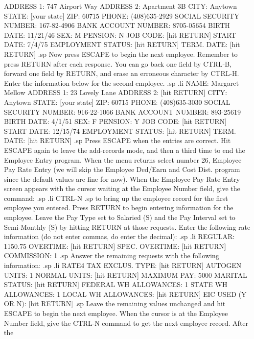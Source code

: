    ADDRESS 1: 747 Airport Way
   ADDRESS 2: Apartment 3B
   CITY:      Anytown
   STATE:     [your state]
   ZIP:       60715
   PHONE:     (408)635-2929
   SOCIAL SECURITY NUMBER:     167-82-4906
   BANK ACCOUNT NUMBER:        8705-05654
   BIRTH DATE:		       11/21/46
   SEX:        M
   PENSION:    N
   JOB CODE:   [hit RETURN]
   START DATE: 7/4/75
   EMPLOYMENT STATUS: [hit RETURN]
   TERM. DATE: [hit RETURN]
.sp
Now press ESCAPE to begin the next employee.
Remember to press RETURN after each response.  You can go back one
field by CTRL-B, forward one field by RETURN, and erase an erroneous
character by CTRL-H.  Enter the information below for the second employee.
.sp
.li
   NAME:      Margaret Mellow
   ADDRESS 1: 23 Lovely Lane
   ADDRESS 2: [hit RETURN]
   CITY:      Anytown
   STATE:     [your state]
   ZIP:       60715
   PHONE:     (408)635-3030
   SOCIAL SECURITY NUMBER:     916-22-1066
   BANK ACCOUNT NUMBER:        893-25619
   BIRTH DATE:		       4/1/51
   SEX:        F
   PENSION:    Y
   JOB CODE:   [hit RETURN]
   START DATE: 12/15/74
   EMPLOYMENT STATUS:  [hit RETURN]
   TERM. DATE: [hit RETURN]
.sp
Press ESCAPE when the entries are correct.  Hit ESCAPE again
to leave the add-records mode, and then a third time
to end the Employee Entry program.  When the menu returns select number
26, Employee Pay Rate Entry (we will skip the Employee Ded/Earn and Cost Dist.
program since the default values are fine for now).  When the Employee Pay
Rate Entry screen appears with the cursor waiting at the Employee Number
field, give the command:
.sp
.li
		CTRL-N
.sp
to bring up the employee record for the first employee you entered.
Press RETURN to begin entering information for the employee.
Leave the Pay Type set to Salaried (S) and the Pay Interval set to
Semi-Monthly (S) by hitting RETURN at those requests.  Enter the following
rate information (do not enter commas, do enter the decimal):
.sp
.li
   REGULAR:	   1150.75
   OVERTIME:	   [hit RETURN]
   SPEC. OVERTIME: [hit RETURN]
   COMMISSION:	   1
.sp
Answer the remaining requests with the following information:
.sp
.li
   RATE4 TAX EXCLUS. TYPE: [hit RETURN]
   AUTOGEN UNITS:	   1
   NORMAL UNITS:	   [hit RETURN]
   MAXIMUM PAY: 	   5000
   MARITAL STATUS:	   [hit RETURN]
   FEDERAL WH ALLOWANCES:  1
   STATE   WH ALLOWANCES:  1
   LOCAL   WH ALLOWANCES:  [hit RETURN]
   EIC USED (Y OR N):	   [hit RETURN]
.sp
Leave the remaining values unchanged and hit ESCAPE to begin the
next employee.	When the cursor is at the Employee Number field,
give the CTRL-N command to get the next employee record.  After the
